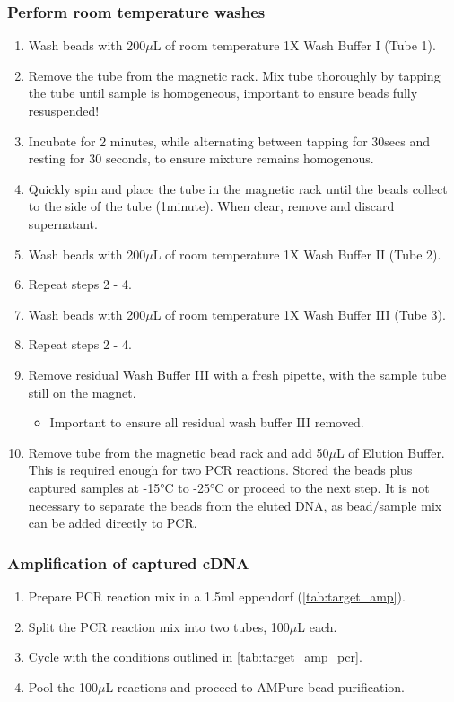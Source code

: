 \subsubsection{Perform room temperature washes}
\label{rmtempwashes}
\begin{enumerate}
	\item Wash beads with 200$\mu$L of room temperature 1X Wash Buffer I (Tube 1). 
	\item Remove the tube from the magnetic rack. Mix tube thoroughly by tapping the tube until sample is homogeneous, important to ensure beads fully resuspended! 
	\item Incubate for 2 minutes, while alternating between tapping for 30secs and resting for 30 seconds, to ensure mixture remains homogenous.
	\item Quickly spin and place the tube in the magnetic rack until the beads collect to the side of the tube (1minute). When clear, remove and discard supernatant.
	\item Wash beads with 200$\mu$L of room temperature 1X Wash Buffer II (Tube 2). 
	\item Repeat steps 2 - 4.
	\item Wash beads with 200$\mu$L of room temperature 1X Wash Buffer III (Tube 3). 
	\item Repeat steps 2 - 4.
	\item Remove residual Wash Buffer III with a fresh pipette, with the sample tube still on the magnet.
	\begin{itemize}	
		\item Important to ensure all residual wash buffer III removed. 
	\end{itemize}  
	\item Remove tube from the magnetic bead rack and add 50$\mu$L of Elution Buffer.
	This is required enough for two PCR reactions. Stored the beads plus captured samples at -15°C to -25°C or proceed to the next step. It is not necessary to separate the beads from the eluted DNA, as bead/sample mix can be added directly to PCR.
\end{enumerate}

\subsubsection{Amplification of captured cDNA}
\begin{enumerate}
	\item Prepare PCR reaction mix in a 1.5ml eppendorf (\cref{tab:target_amp}).
	\item Split the PCR reaction mix into two tubes, 100$\mu$L each. 
	\item Cycle with the conditions outlined in \cref{tab:target_amp_pcr}.
	\item Pool the 100$\mu$L reactions and proceed to AMPure bead purification.
\end{enumerate}


